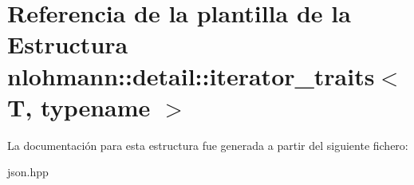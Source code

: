 \hypertarget{structnlohmann_1_1detail_1_1iterator__traits}{}\section{Referencia de la plantilla de la Estructura nlohmann\+:\+:detail\+:\+:iterator\+\_\+traits$<$ T, typename $>$}
\label{structnlohmann_1_1detail_1_1iterator__traits}


La documentación para esta estructura fue generada a partir del siguiente fichero\+:\begin{DoxyCompactItemize}
\item 
json.\+hpp\end{DoxyCompactItemize}
